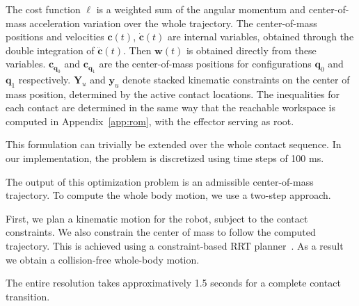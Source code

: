 The cost function $\ell$ is a weighted sum of the angular momentum and center-of-mass acceleration variation over the whole trajectory.
The center-of-mass positions and velocities $\mathbf{c}(t)$, $\mathbf{\dot{c}}(t)$ are internal variables, obtained through the double integration of $\mathbf{\ddot{c}}(t)$.
Then $\mathbf{w}(t)$ is obtained directly from these variables. $\mathbf{c}_{\mathbf{q}_0}$ and $\mathbf{c}_{\mathbf{q}_1}$ are the center-of-mass positions for configurations
 $\mathbf{q}_0$ and $\mathbf{q}_1$ respectively.
$\mathbf{Y}_u$ and $\mathbf{y}_u$ denote stacked kinematic constraints on the center of mass position, determined by the active contact locations.
The inequalities for each contact are determined in the same way that the reachable workspace is computed in Appendix~\ref{app:rom}, with
the effector serving as root. %

This formulation can trivially be extended over the whole contact sequence.
In our implementation, the problem is discretized using time steps of 100 ms. 

The output of this optimization problem is an admissible center-of-mass trajectory.
To compute the whole body motion, we use a two-step approach.

First, we plan a kinematic motion for the robot, subject to the contact constraints. We also constrain the center of mass to follow
the computed trajectory. This is achieved using a constraint-based RRT planner~\citep{7759083}. As a result we obtain a collision-free whole-body motion.

The entire resolution takes approximatively 1.5 seconds for a complete contact transition.

